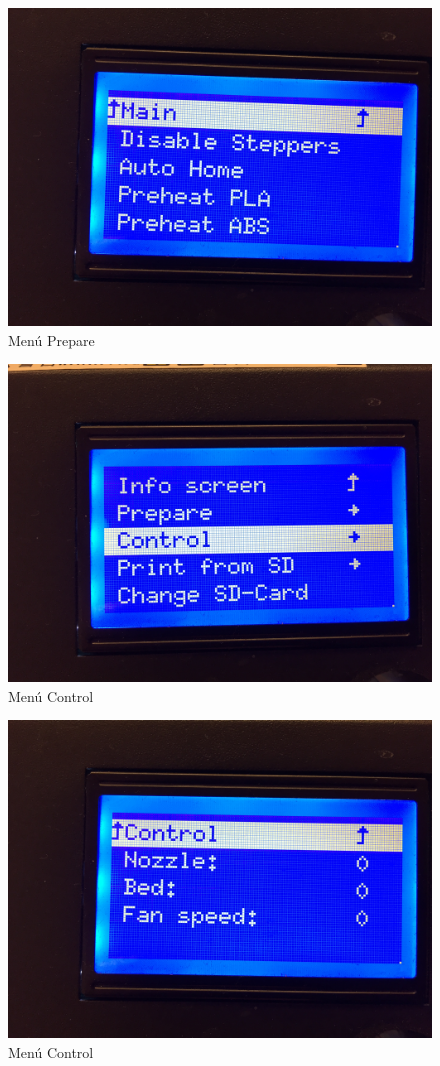 \documentclass{beamer}
\begin{document}
	\begin{frame}
		\begin{figure}
			\includegraphics[height=0.6\textwidth]{images/prepare}
			\caption{Menú Prepare}
		\end{figure}
	\end{frame}
	\begin{frame}
		\begin{figure}
			\includegraphics[height=0.6\textwidth]{images/menu_control}
			\caption{Menú Control}
		\end{figure}
	\end{frame}
	\begin{frame}
		\begin{figure}
			\includegraphics[height=0.6\textwidth]{images/temperature}
			\caption{Menú Control}
		\end{figure}
	\end{frame}
\end{document}
